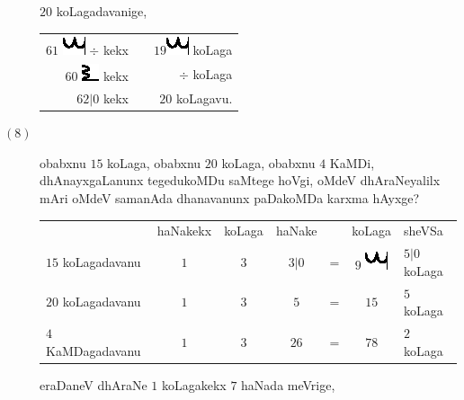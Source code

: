 \begin{description}
    $20$ koLagadavanige,

    \begin{tabular}{rc@{\qquad}r}
    $61$ \includegraphics{images/mu.eps} $\div$ kekx & &
    $19$\includegraphics{images/mu.eps} koLaga\\ 
    $60$ \includegraphics{images/R.eps} kekx & &
    $\div$ koLaga\\
    \cline{1-1}  \cline{3-3}
    $62|0$ kekx & & $20$ koLagavu.
    \end{tabular}

\item[$(8)$] obabxnu $15$ koLaga, obabxnu $20$ koLaga, obabxnu $4$
    KaMDi, dhAnayxgaLanunx tegedukoMDu saMtege hoVgi, oMdeV
    dhAraNeyalilx mAri oMdeV samanAda dhanavanunx paDakoMDa karxma
    hAyxge?

    {\setlength\tabcolsep{1pt}    
    \begin{tabular}{lcccccl}
    & haNakekx & koLaga & haNake & & koLaga & sheVSa\\
    $15$ koLagadavanu & $1$ & $3$ & $3|$0 & = &
    $9$ \includegraphics{images/mu.eps}  & $5|$0 koLaga\\
    $20$ koLagadavanu & $1$ & $3$ & $5$ & = & $15$ & $5$ koLaga\\
    $4$ KaMDagadavanu & $1$ & $3$ & $26$ & = & $78$ & $2$ koLaga
    \end{tabular}}

    eraDaneV dhAraNe $1$ koLagakekx $7$ haNada meVrige,


\end{description}
